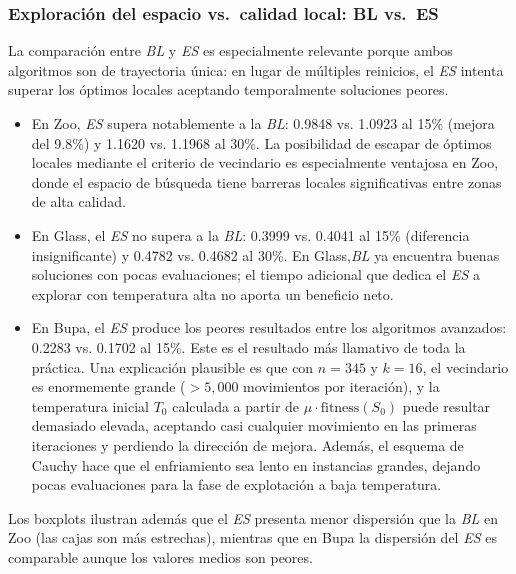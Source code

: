 \documentclass[12pt]{article}
\begin{document}
\subsubsection*{Exploración del espacio vs.\ calidad local: BL vs.\ ES}
 
La comparación entre \textit{BL} y \textit{ES} es especialmente relevante porque ambos algoritmos
son de trayectoria única: en lugar de múltiples reinicios, el \textit{ES} intenta superar los
óptimos locales aceptando temporalmente soluciones peores.
 
\begin{itemize}
    \item En {Zoo}, \textit{ES} supera notablemente a la \textit{BL}: 0.9848 vs. 1.0923 al
    15\% (mejora del 9.8\%) y 1.1620 vs. 1.1968 al 30\%.  La posibilidad de
    escapar de óptimos locales mediante el criterio de vecindario es especialmente
    ventajosa en Zoo, donde el espacio de búsqueda tiene barreras locales significativas
    entre zonas de alta calidad.
 
    \item En {Glass}, el \textit{ES} no supera a la \textit{BL}: 0.3999 vs. 0.4041 al 15\%
    (diferencia insignificante) y 0.4782 vs. 0.4682 al 30\%.  En Glass,\textit{BL} ya encuentra buenas soluciones con pocas evaluaciones; el tiempo adicional que dedica el \textit{ES} a explorar con temperatura alta
    no aporta un beneficio neto.
 
    \item En {Bupa}, el \textit{ES} produce los peores resultados entre los algoritmos
    avanzados: 0.2283 vs. 0.1702 al 15\%.  Este es el resultado más llamativo de
    toda la práctica. Una explicación plausible es que con $n=345$ y $k=16$, el
    vecindario es enormemente grande ($>5{,}000$ movimientos por iteración), y la
    temperatura inicial $T_0$ calculada a partir de $\mu \cdot \text{fitness}(S_0)$ puede
    resultar demasiado elevada, aceptando casi cualquier movimiento en las primeras
    iteraciones y perdiendo la dirección de mejora. Además, el esquema de Cauchy hace
    que el enfriamiento sea lento en instancias grandes, dejando pocas evaluaciones para
    la fase de explotación a baja temperatura.
\end{itemize}
 
\noindent Los boxplots ilustran además que el \textit{ES} presenta menor dispersión que la \textit{BL} en
Zoo (las cajas son más estrechas), mientras que en Bupa la dispersión del \textit{ES} es
comparable aunque los valores medios son peores.
 
\end{document}
